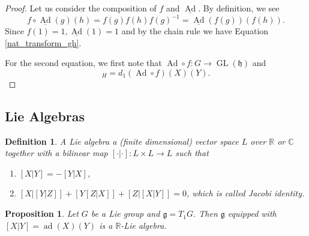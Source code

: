 \documentclass{article}
\newtheorem{proposition}{Proposition}[section]
\newtheorem{definition}{Definition}[section]
\numberwithin{equation}{section}
\DeclareMathOperator{\Ad}{Ad}
\DeclareMathOperator{\ad}{ad}
\DeclareMathOperator{\GL}{GL}
\begin{document}
\begin{proof}
Let us consider the composition of $f$ and $\underline{\Ad}$. By definition, we see
\begin{equation*}
f\circ\underline{\Ad}(g)(h) =  f(g)f(h)f(g)^{-1}=\underline{\Ad}(f(g))(f(h)).
\end{equation*}
Since $f(1)=1,\underline{\Ad}(1) = 1$ and by the chain rule we have Equation \eqref{nat_transform_gh}.\\
\par For the second equation, we first note that $\Ad\circ f:G\to \GL(\mathfrak{h})$ and 
\begin{equation*}
[d_1fX,d_1fY]_H = d_1(\Ad\circ f)(X)(Y).
\end{equation*}

\end{proof}

\subsection{Lie Algebras}

\begin{definition}
A Lie algebra a (finite dimensional) vector space $L$ over $\mathbb{R}$ or $\mathbb{C}$ together with a bilinear map $[\cdot|\cdot]:L\times L\to L$ such that
\begin{enumerate}[i]
\item $[X|Y]=-[Y|X]$,
\item $[X|[Y|Z]]+[Y[Z|X]]+[Z|[X|Y]]=0$, which is called Jacobi identity.
\end{enumerate}
\end{definition}

\begin{proposition}
Let $G$ be a Lie group and $\mathfrak{g}=T_1G$. Then $\mathfrak{g}$ equipped with $[X|Y] = \ad(X)(Y)$ is a $\mathbb{R}$-Lie algebra.
\end{proposition}
\end{document}
